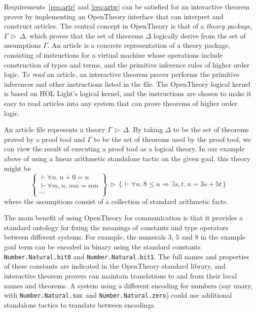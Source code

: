 \documentclass{llncs}
\newcommand{\OpenTheory}{OpenTheory\xspace}
\newcommand{\theory}[2]{{#1}\,\triangleright\,{#2}}
\begin{document}
Requirements~\ref{req:artr} and \ref{req:artw} can be satisfied for an interactive theorem prover by implementing an \OpenTheory interface that can interpret and construct articles.
The central concept in \OpenTheory is that of a \emph{theory package}, $\theory{\Gamma}{\Delta}$, which proves that the set of theorems $\Delta$ logically derive from the set of assumptions $\Gamma$.
An article is a concrete representation of a theory package, consisting of instructions for a virtual machine whose operations include construction of types and terms, and the primitive inference rules of higher order logic.
To \emph{read} an article, an interactive theorem prover performs the primitive inferences and other instructions listed in the file.
The \OpenTheory logical kernel is based on HOL Light's logical kernel, and the instructions are chosen to make it easy to read articles into any system that can prove theorems of higher order logic.

An article file represents a theory $\theory{\Gamma}{\Delta}$.
By taking $\Delta$ to be the set of theorems proved by a proof tool and $\Gamma$ to be the set of theorems used by the proof tool, we can view the result of executing a proof tool as a logical theory.
In our example above of using a linear arithmetic standalone tactic on the given goal, this theory might be
\[
\theory{\left\{\begin{array}{l}
\vdash\forall n.\ n + 0 = n \\
\vdash\forall m,n.\ mn = nm \\
\cdots
\end{array}\right\}}
{\bigl\{\,\vdash\forall n.\ 8\le n\Rightarrow\exists s,t.\ n = 3s + 5t\,\bigr\}}
\]
where the assumptions consist of a collection of standard arithmetic facts.


The main benefit of using \OpenTheory for communication is that it provides a standard ontology for fixing the meanings of constants and type operators between different systems.
For example, the numerals $3$, $5$ and $8$ in the example goal term can be encoded in binary using the standard constants \texttt{Number.Natural.bit0} and \texttt{Number.Natural.bit1}.
The full names and properties of these constants are indicated in the \OpenTheory standard library, and interactive theorem provers can maintain translations to and from their local names and theorems.
A system using a different encoding for numbers (say unary, with \texttt{Number.Natural.suc} and \texttt{Number.Natural.zero}) could use additional standalone tactics to translate between encodings.
\end{document}
